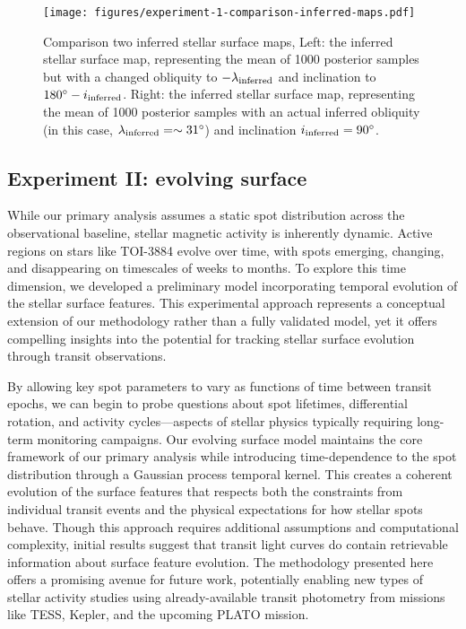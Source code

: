 \documentclass[twocolumn]{aastex631}
\begin{document}
%
\begin{figure*}[hbt!]
    \begin{centering}
        \texttt{[image: figures/experiment-1-comparison-inferred-maps.pdf]}
        \caption{
            Comparison two inferred stellar surface maps, Left: the inferred stellar surface map, representing the mean of 1000 posterior samples
            but with a changed obliquity to $-\lambda_{\rm inferred}$ and inclination to  $180^\circ-i_{\rm inferred}$. 
            Right: the inferred stellar surface map, representing the mean of 1000 posterior samples
            with an actual inferred obliquity (in this case, $\lambda_{\rm inferred}=\sim 31^\circ$) and inclination $i_{\rm inferred}=90^\circ$.
        }
        \label{fig:experiment-1-inf-map-comparison}
    \end{centering}
\end{figure*}
%

\subsection{Experiment II: evolving surface}
\label{sec:experiment2}

While our primary analysis assumes a static spot distribution across the observational baseline, stellar magnetic activity is 
inherently dynamic. Active regions on stars like TOI-3884 evolve over time, with spots emerging, changing, and disappearing on 
timescales of weeks to months. To explore this time dimension, we developed a preliminary model incorporating temporal 
evolution of the stellar surface features. This experimental approach represents a conceptual extension of our methodology 
rather than a fully validated model, yet it offers compelling insights into the potential for tracking stellar surface evolution 
through transit observations.

By allowing key spot parameters to vary as functions of time between transit epochs, we can begin to probe questions about spot 
lifetimes, differential rotation, and activity cycles—aspects of stellar physics typically requiring long-term monitoring campaigns. 
Our evolving surface model maintains the core framework of our primary analysis while introducing time-dependence to the 
spot distribution through a Gaussian process temporal kernel. This creates a coherent evolution of the surface features that 
respects both the constraints from individual transit events and the physical expectations for how stellar spots behave.
Though this approach requires additional assumptions and computational complexity, initial results suggest that transit light 
curves do contain retrievable information about surface feature evolution. The methodology presented here offers a 
promising avenue for future work, potentially enabling new types of stellar activity studies using already-available 
transit photometry from missions like TESS, Kepler, and the upcoming PLATO mission.
\end{document}
